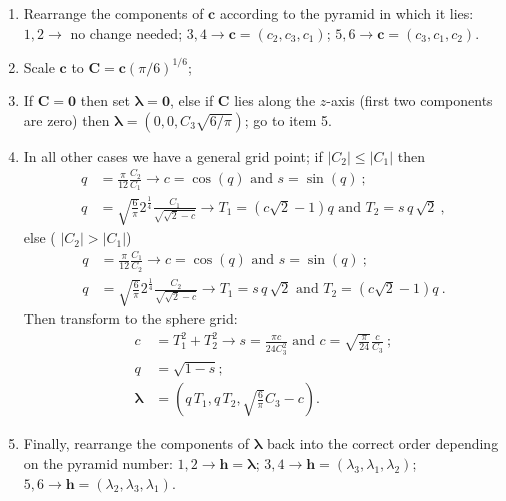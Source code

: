 \begin{enumerate}
	\item Rearrange the components of $\mathbf{c}$ according to the pyramid in which it lies:  $1,2\rightarrow$ no change needed;
	$3,4\rightarrow \mathbf{c}=(c_2,c_3,c_1)$; $5,6\rightarrow \mathbf{c}=(c_3,c_1,c_2)$.
	\item Scale $\mathbf{c}$ to $\mathbf{C} = \mathbf{c}(\pi/6)^{1/6}$;
	\item If $\mathbf{C}=\mathbf{0}$ then set $\bm{\lambda}=\mathbf{0}$, else if $\mathbf{C}$ lies along the $z$-axis (first two components are zero) then 
	$\bm{\lambda}=(0,0,C_3\sqrt{6/\pi})$; go to item 5.
	\item In all other cases we have a general grid point; if $\vert C_2\vert \le \vert C_1\vert$ then
	\begin{equation*}
	\begin{split}
		q &= \frac{\pi}{12}\frac{C_2}{C_1}\rightarrow c = \cos(q)\text{ and }s = \sin(q)\ ;\\
		q &= \sqrt{\frac{6}{\pi}}2^{\frac{1}{4}} \frac{C_1}{\sqrt{\sqrt{2}-c}}\rightarrow T_1 = (c\sqrt{2}-1)q\text{ and }T_2 = s\,q\,\sqrt{2}\ , 
	\end{split}
	\end{equation*}
	else ( $\vert C_2\vert > \vert C_1\vert$)
	\begin{equation*}
	\begin{split}
		q &= \frac{\pi}{12}\frac{C_1}{C_2}\rightarrow c = \cos(q)\text{ and }s = \sin(q)\ ;\\
		q &= \sqrt{\frac{6}{\pi}}2^{\frac{1}{4}} \frac{C_2}{\sqrt{\sqrt{2}-c}}\rightarrow T_1 = s\,q\,\sqrt{2}\text{ and }T_2 = (c\sqrt{2}-1)q\ .
	\end{split}
	\end{equation*}
	Then transform to the sphere grid:
	\begin{equation*}
	\begin{split}
		c &= T_1^2+T_2^2\rightarrow s = \frac{\pi c}{24 C_3^2}\text{ and }c = \sqrt{\frac{\pi}{24}}\frac{c}{C_3}\ ;\\
		q &= \sqrt{1-s};\\
		\bm{\lambda} &= (q\,T_1, q\,T_2, \sqrt{\frac{6}{\pi}}C_3-c).
	\end{split}
	\end{equation*}
	\item Finally, rearrange the components of $\bm{\lambda}$ back into the correct order depending on
	the pyramid number: $1,2\rightarrow \mathbf{h}=\bm{\lambda}$; $3,4\rightarrow \mathbf{h}=(\lambda_3,\lambda_1,\lambda_2)$;
	$5,6\rightarrow \mathbf{h}=(\lambda_2,\lambda_3,\lambda_1)$.  
\end{enumerate}

